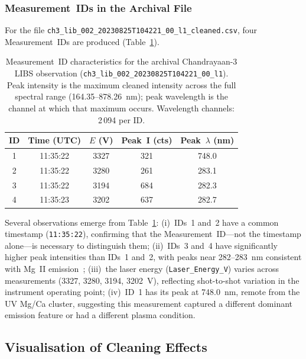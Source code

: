 \documentclass[a4paper,twocolumn,10pt]{article}
\begin{document}
\subsubsection{Measurement~IDs in the Archival File}

For the file \texttt{ch3\_lib\_002\_20230825T104221\_00\_l1\_cleaned.csv},
four Measurement~IDs are produced (Table~\ref{tab:measurement_ids}).

\begin{table}[!t]
\centering
\caption{Measurement~ID characteristics for the archival
  Chandrayaan-3 LIBS observation
  (\texttt{ch3\_lib\_002\_20230825T104221\_00\_l1}).
  Peak intensity is the maximum cleaned intensity across the full
  spectral range (164.35--878.26~nm); peak wavelength is the
  channel at which that maximum occurs.
  Wavelength channels: 2\,094 per ID.}
\label{tab:measurement_ids}
\begin{tabularx}{\textwidth}{@{}ccccc@{}}
\toprule
\textbf{ID} & \textbf{Time (UTC)} & \textbf{$E$ (V)} & \textbf{Peak~I (cts)} & \textbf{Peak~$\lambda$ (nm)} \\
\midrule
1 & 11:35:22 & 3327 & 321  & 748.0 \\
2 & 11:35:22 & 3280 & 261  & 283.1 \\
3 & 11:35:22 & 3194 & 684  & 282.3 \\
4 & 11:35:23 & 3202 & 637  & 282.7 \\
\bottomrule
\end{tabularx}
\end{table}

Several observations emerge from Table~\ref{tab:measurement_ids}:
(i)~IDs~1 and~2 have a common timestamp (\texttt{11:35:22}),
confirming that the Measurement~ID---not the timestamp alone---is
necessary to distinguish them; (ii)~IDs~3 and~4 have significantly
higher peak intensities than IDs~1 and~2, with peaks near 282--283~nm
consistent with Mg~II emission~\cite{NIST}; (iii)~the laser energy
(\texttt{Laser\_Energy\_V}) varies across measurements (3327, 3280,
3194, 3202~V), reflecting shot-to-shot variation in the instrument
operating point; (iv)~ID~1 has its peak at 748.0~nm, remote from the
UV Mg/Ca cluster, suggesting this measurement captured a different
dominant emission feature or had a different plasma condition.

\subsection{Visualisation of Cleaning Effects}
\end{document}
